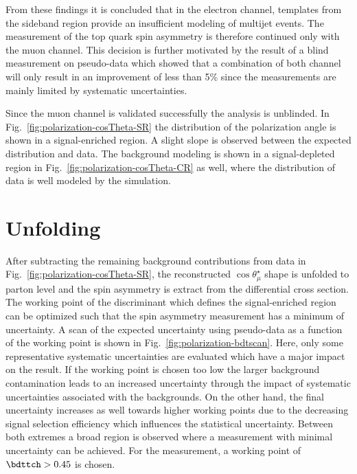 From these findings it is concluded that in the electron channel, templates from the sideband region provide an insufficient modeling of multijet events. The measurement of the top quark spin asymmetry is therefore continued only with the muon channel. This decision is further motivated by the result of a blind measurement on pseudo-data which showed that a combination of both channel will only result in an improvement of less than 5\% since the measurements are mainly limited by systematic uncertainties.

Since the muon channel is validated successfully the analysis is unblinded. In Fig.~\ref{fig:polarization-cosTheta-SR} the distribution of the polarization angle is shown in a signal-enriched region. A slight slope is observed between the expected distribution and data. The background modeling is shown in a signal-depleted region in Fig.~\ref{fig:polarization-cosTheta-CR} as well, where the distribution of data is well modeled by the simulation.


\section{Unfolding}
\label{sec:polarization-unfolding}

After subtracting the remaining background contributions from data in Fig.~\ref{fig:polarization-cosTheta-SR}, the reconstructed $\cos\theta_{\mu}^\star$ shape is unfolded to parton level and the spin asymmetry is extract from the differential cross section. The working point of the \bdttch discriminant which defines the signal-enriched region can be optimized such that the spin asymmetry measurement has a minimum of uncertainty. A scan of the expected uncertainty using pseudo-data as a function of the \bdttch working point is shown in Fig.~\ref{fig:polarization-bdtscan}. Here, only some representative systematic uncertainties are evaluated which have a major impact on the result. If the working point is chosen too low the larger background contamination leads to an increased uncertainty through the impact of systematic uncertainties associated with the backgrounds. On the other hand, the final uncertainty increases as well towards higher working points due to the decreasing signal selection efficiency which influences the statistical uncertainty. Between both extremes a broad region is observed where a measurement with minimal uncertainty can be achieved. For the measurement, a working point of $\bdttch>0.45$ is chosen. 

